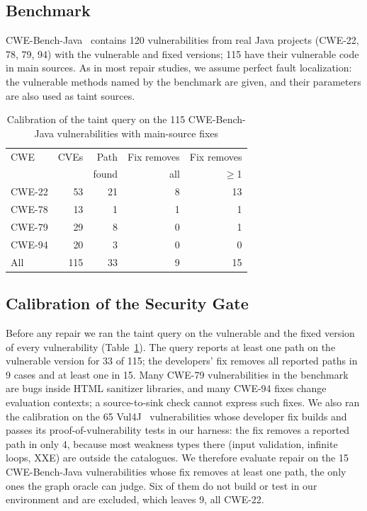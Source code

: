\documentclass[conference]{IEEEtran}
\begin{document}
\subsection{Benchmark}
CWE-Bench-Java~\cite{li2025iris} contains 120 vulnerabilities from real Java projects
(CWE-22, 78, 79, 94) with the vulnerable and fixed versions; 115 have their vulnerable
code in main sources. As in most repair studies, we assume perfect fault localization:
the vulnerable methods named by the benchmark are given, and their parameters are also
used as taint sources.

\begin{table}[t]
\centering
\caption{Calibration of the taint query on the 115 CWE-Bench-Java vulnerabilities with
main-source fixes}
\label{tab:calib}
\begin{tabular}{lrrrr}
\toprule
CWE & CVEs & Path & Fix removes & Fix removes \\
    &      & found & all & $\ge$1 \\
\midrule
CWE-22 & 53 & 21 & 8 & 13 \\
CWE-78 & 13 & 1 & 1 & 1 \\
CWE-79 & 29 & 8 & 0 & 1 \\
CWE-94 & 20 & 3 & 0 & 0 \\
\midrule
All & 115 & 33 & 9 & 15 \\
\bottomrule
\end{tabular}
\end{table}

\subsection{Calibration of the Security Gate}
\label{sec:calib}
Before any repair we ran the taint query on the vulnerable and the fixed version of every
vulnerability (Table~\ref{tab:calib}). The query reports at least one path on the
vulnerable version for 33 of 115; the developers' fix removes all reported paths in 9
cases and at least one in 15. Many CWE-79 vulnerabilities in the benchmark are bugs
inside HTML sanitizer libraries, and many CWE-94 fixes change evaluation contexts; a
source-to-sink check cannot express such fixes. We also ran the calibration on the 65
Vul4J~\cite{bui2022vul4j} vulnerabilities whose developer fix builds and passes its
proof-of-vulnerability tests in our harness: the fix removes a reported path in only 4,
because most weakness types there (input validation, infinite loops, XXE) are outside
the catalogues. We therefore evaluate repair on the 15 CWE-Bench-Java vulnerabilities
whose fix removes at least one path, the only ones the graph oracle can judge. Six of
them do not build or test in our environment and are excluded, which leaves 9, all
CWE-22.
\end{document}
